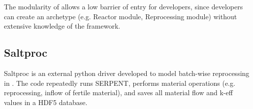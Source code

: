The modularity of \Cyclus allows a low barrier of
entry for developers, since developers can create an
archetype (e.g. Reactor module, Reprocessing module)
without extensive knowledge of the \Cyclus framework.

\subsection{Saltproc}
Saltproc is an external python driver developed to
model batch-wise reprocessing in . The code
repeatedly runs SERPENT, performs material operations (e.g. reprocessing,
inflow of fertile material), and saves all material flow
and k-eff values in a HDF5 database. 
